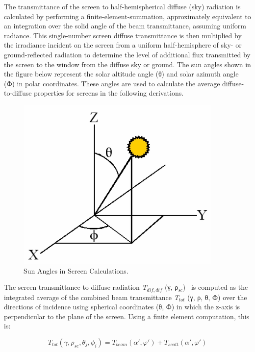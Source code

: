 The transmittance of the screen to half-hemispherical diffuse (sky) radiation is calculated by performing a finite-element-summation, approximately equivalent to an integration over the solid angle of the beam transmittance, assuming uniform radiance. This single-number screen diffuse transmittance is then multiplied by the irradiance incident on the screen from a uniform half-hemisphere of sky- or ground-reflected radiation to determine the level of additional flux transmitted by the screen to the window from the diffuse sky or ground. The sun angles shown in the figure below represent the solar altitude angle (θ) and solar azimuth angle (Ф) in polar coordinates. These angles are used to calculate the average diffuse-to-diffuse properties for screens in the following derivations.

\begin{figure}[hbtp] %
\centering
\includegraphics[width=0.9\textwidth, height=0.9\textheight, keepaspectratio=true]{media/image1210.png}
\caption{Sun Angles in Screen Calculations. \protect \label{fig:sun-angles-in-screen-calculations.}}
\end{figure}

The screen transmittance to diffuse radiation \emph{T\(_{dif,dif}\)} (γ, ρ\(_{sc}\))~ is computed as the integrated average of the combined beam transmittance \emph{T\(_{tot}\)} (γ, ρ, θ, Ф) over the directions of incidence using spherical coordinates (θ, Ф) in which the z-axis is perpendicular to the plane of the screen. Using a finite element computation, this is:

\begin{equation}
{T_{tot}}(\gamma ,{\rho_{sc}},{\theta_j},{\phi_i}) = {T_{beam}}\left( {\alpha ',\varphi '} \right) + {T_{scatt}}\left( {\alpha ',\varphi '} \right)
\end{equation}

